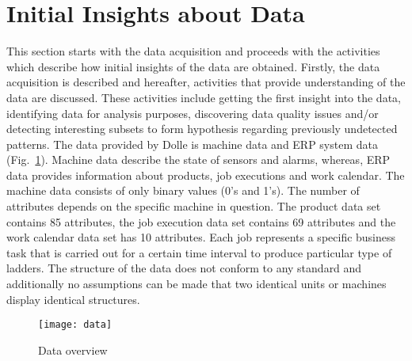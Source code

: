 \documentclass[runningheads]{llncs}
\begin{document}
\section{Initial Insights about Data}
\label{sec:dataunderstanding}
This section starts with the data acquisition and proceeds with the activities which describe how initial insights of the data are obtained. Firstly, the data acquisition is described and hereafter, activities that provide understanding of the data are discussed. These activities include getting the first insight into the data, identifying data for analysis purposes, discovering data quality issues and/or detecting interesting subsets to form hypothesis regarding previously undetected patterns. The data provided by Dolle is machine data and ERP system data (Fig.~\ref{fig:data}). Machine data describe the state of sensors and alarms, whereas, ERP data provides information about products, job executions and work calendar. The machine data consists of only binary values (0's and 1's). The number of attributes depends on the specific machine in question. The product data set contains 85 attributes, the job execution data set contains 69 attributes and the work calendar data set has 10 attributes. Each job represents a specific business task that is carried out for a certain time interval to produce particular type of ladders. The structure of the data does not conform to any standard and additionally no assumptions can be made that two identical units or machines display identical structures. 

\begin{figure}
\centering
\texttt{[image: data]} 
 \vspace{-7mm}
\caption{Data overview}
\label{fig:data}
\end{figure}
\end{document}
